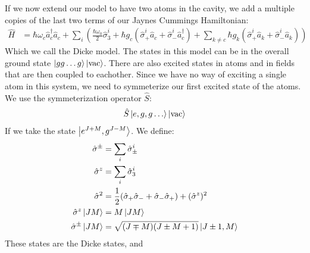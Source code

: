 If we now extend our model to have two atoms in the cavity, we add a multiple copies of the last two terms of our Jaynes Cummings Hamiltonian:
\begin{align*}
	\hat{H} &= \hbar\omega_c \hat{a}_c^\dagger\hat{a}_c + \sum_i \left(\frac{\hbar\omega_0}{2}\hat{\sigma}_3^i + \hbar g_c (\hat{\sigma}_+^i\hat{a}_c + \hat{\sigma}_-^i \hat{a}_c^\dagger) 
		+ \sum_{k\neq c} \hbar g_k (\hat{\sigma}_+^i\hat{a}_k + \hat{\sigma}_-^i\hat{a}_k)\right)
\end{align*}
Which we call the Dicke model. The states in this model can be in the overall ground state $\ket{gg\ldots g}\ket{\text{vac}}$. There are also excited states in atoms and in fields that are then coupled to eachother.
Since we have no way of exciting a single atom in this system, we need to symmeterize our first excited state of the atoms. We use the symmeterization operator $\hat{S}$:
\begin{align*}
	\hat{S}\ket{e,g,g\ldots}\ket{\text{vac}} 
\end{align*}
If we take the state $\ket{e^{J+M}, g^{J-M}}$. We define:
\begin{align*}
	\hat{\sigma}^\pm &= \sum_i \hat{\sigma}_\pm^i \\
	\hat{\sigma}^z &= \sum_i \hat{\sigma}_3^i \\
	\hat{\sigma}^2 &= \frac{1}{2}(\hat{\sigma}_+\hat{\sigma}_- + \hat{\sigma}_-\hat{\sigma}_+) + (\hat{\sigma}^z)^2 \\
	\hat{\sigma}^z\ket{JM} &= M\ket{JM} \\
	\hat{\sigma}^\pm \ket{JM} &= \sqrt{(J\mp M)(J\pm M +1)}\ket{J\pm 1,M}
\end{align*}
These states are the Dicke states, and 

